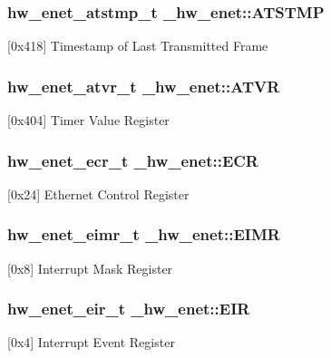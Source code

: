 \subsubsection[{\texorpdfstring{A\+T\+S\+T\+MP}{ATSTMP}}]{ {\bf hw\+\_\+enet\+\_\+atstmp\+\_\+t} \+\_\+hw\+\_\+enet\+::\+A\+T\+S\+T\+MP}\hypertarget{struct__hw__enet_aecc725092229a8fa5c9d8c3e2b11cba4}{}\label{struct__hw__enet_aecc725092229a8fa5c9d8c3e2b11cba4}
\mbox{[}0x418\mbox{]} Timestamp of Last Transmitted Frame 
\subsubsection[{\texorpdfstring{A\+T\+VR}{ATVR}}]{ {\bf hw\+\_\+enet\+\_\+atvr\+\_\+t} \+\_\+hw\+\_\+enet\+::\+A\+T\+VR}\hypertarget{struct__hw__enet_ac9f9d6e95d9eb8bd04a8fc931a3a23ec}{}\label{struct__hw__enet_ac9f9d6e95d9eb8bd04a8fc931a3a23ec}
\mbox{[}0x404\mbox{]} Timer Value Register 
\subsubsection[{\texorpdfstring{E\+CR}{ECR}}]{ {\bf hw\+\_\+enet\+\_\+ecr\+\_\+t} \+\_\+hw\+\_\+enet\+::\+E\+CR}\hypertarget{struct__hw__enet_a33e07f1cb6b8738264442aaf187f3da7}{}\label{struct__hw__enet_a33e07f1cb6b8738264442aaf187f3da7}
\mbox{[}0x24\mbox{]} Ethernet Control Register 
\subsubsection[{\texorpdfstring{E\+I\+MR}{EIMR}}]{ {\bf hw\+\_\+enet\+\_\+eimr\+\_\+t} \+\_\+hw\+\_\+enet\+::\+E\+I\+MR}\hypertarget{struct__hw__enet_a500db24e26332248656fbca29038daa6}{}\label{struct__hw__enet_a500db24e26332248656fbca29038daa6}
\mbox{[}0x8\mbox{]} Interrupt Mask Register 
\subsubsection[{\texorpdfstring{E\+IR}{EIR}}]{ {\bf hw\+\_\+enet\+\_\+eir\+\_\+t} \+\_\+hw\+\_\+enet\+::\+E\+IR}\hypertarget{struct__hw__enet_a4153ebf1a9c3009db2b5cd0683d5825d}{}\label{struct__hw__enet_a4153ebf1a9c3009db2b5cd0683d5825d}
\mbox{[}0x4\mbox{]} Interrupt Event Register 
